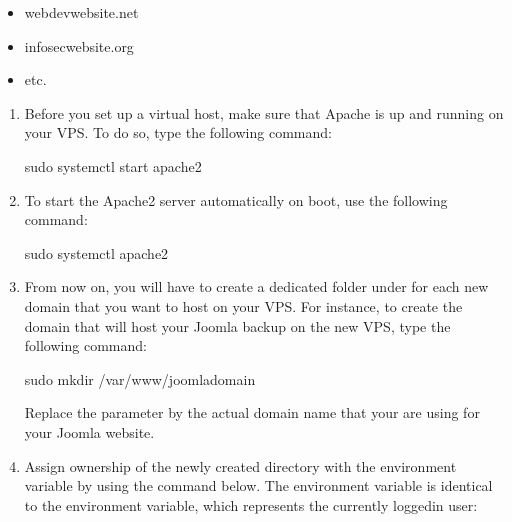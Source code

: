 \documentclass[a4paper,10pt,english,openany,oneside]{sphinxmanual}
\begin{document}
\begin{sloppypar}
\begin{itemize}
\item {} 
\sphinxAtStartPar
webdev\sphinxhyphen{}website.net

\item {} 
\sphinxAtStartPar
infosec\sphinxhyphen{}website.org

\item {} 
\sphinxAtStartPar
etc.

\end{itemize}
\begin{enumerate}
%
\item {} 
\sphinxAtStartPar
Before you set up a virtual host, make sure that Apache is up and running on your VPS. To do so, type the following command:

\begin{sphinxVerbatim}[commandchars=\\\{\}]
\PYGZdl{} sudo systemctl start apache2
\end{sphinxVerbatim}

\item {} 
\sphinxAtStartPar
To start the Apache2 server automatically on boot, use the following command:

\begin{sphinxVerbatim}[commandchars=\\\{\}]
\PYGZdl{} sudo systemctl  apache2
\end{sphinxVerbatim}

\item {} 
\sphinxAtStartPar
From now on, you will have to create a dedicated folder under  for each new domain that you want to host on your VPS. For instance, to create the domain that will host your Joomla backup on the new VPS, type the following command:

\begin{sphinxVerbatim}[commandchars=\\\{\}]
\PYGZdl{} sudo mkdir /var/www/joomla\PYGZhy{}domain
\end{sphinxVerbatim}

\sphinxAtStartPar
Replace the parameter  by the actual domain name that your are using for your Joomla website.

\item {} 
\sphinxAtStartPar
Assign ownership of the newly created directory with the  environment variable by using the command below. The  environment variable is identical to the  environment variable, which represents the currently logged\sphinxhyphen{}in user:


\end{enumerate}
\end{sloppypar}
\end{document}
